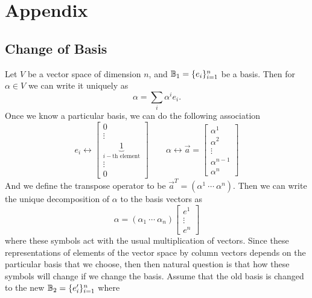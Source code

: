 \chapter{Appendix}


\section{Change of Basis}
Let $ V $ be a vector space of dimension $ n $, and $ \mathbb{B}_1 = \{e_i\}_{i=1}^{n} $ be a basis. Then for $ \alpha \in V $ we can write it uniquely as 
\[ \alpha  = \sum_i \alpha^i e_i. \]
Once we know a particular basis, we can do the following association
\[ e_i \longleftrightarrow 
\begin{bmatrix}
	0 \\
	\vdots \\
	\underbrace{1}_{i-\text{th element}} \\
	\vdots \\
	0
\end{bmatrix} 
\qquad 
\alpha \longleftrightarrow
\vec{a} = 
\begin{bmatrix}
	\alpha^1 \\
	\alpha^2 \\
	\vdots \\
	\alpha^{n-1} \\
	\alpha^n
\end{bmatrix} 
\]
And we define the transpose operator to be $ \vec{a}^T = (\alpha^1\ \cdots\ \alpha^n) $. Then we can write the unique decomposition of $ \alpha $ to the basis vectors as 
\[ \alpha = (\alpha_1\ \cdots\ \alpha_n) 
\begin{bmatrix}
	e^1\\
	\vdots\\
	e^n
\end{bmatrix}
 \]
where these symbols act with the usual multiplication of vectors. Since these representations of elements of the vector space by column vectors depends on the particular basis that we choose, then then natural question is that how these symbols will change if we change the basis. Assume that the old basis is changed to the new $ \mathbb{B}_2 = \{e'_i\}_{i=1}^n $ where
